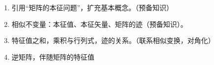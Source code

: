 

\begin{issues}
\issueDraft
\begin{enumerate}
\item 引用“矩阵的本征问题”，扩充基本概念。（预备知识）
\item 相似不变量：本征值、本征矢量、矩阵的迹（预备知识）。
\item 特征值之和，乘积与行列式，迹的关系。（联系相似变换，对角化）
\item 逆矩阵，伴随矩阵的特征值
\end{enumerate}
\end{issues}

